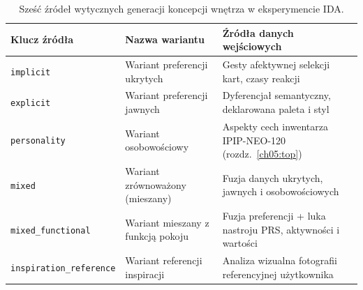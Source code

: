 \begin{table}[htbp]
  \centering
  \caption{Sześć źródeł wytycznych generacji koncepcji wnętrza w eksperymencie IDA.}
  \label{tab:ch03:sources}
  \begin{tabular}{@{}p{}>{\raggedright\arraybackslash}p{}>{\raggedright\arraybackslash}p{}@{}}
    \toprule
    Klucz źródła & Nazwa wariantu & Źródła danych wejściowych \\
    \midrule
    \texttt{implicit}
      & Wariant preferencji ukrytych
      & Gesty afektywnej selekcji kart, czasy reakcji \\
    \texttt{explicit}
      & Wariant preferencji jawnych
      & Dyferencjał semantyczny, deklarowana paleta i styl \\
    \texttt{personality}
      & Wariant osobowościowy
      & Aspekty cech inwentarza IPIP-NEO-120 (rozdz.~\ref{ch05:top}) \\
    \texttt{mixed}
      & Wariant zrównoważony (mieszany)
      & Fuzja danych ukrytych, jawnych i osobowościowych \\
    \texttt{mixed\_functional}
      & Wariant mieszany z funkcją pokoju
      & Fuzja preferencji + luka nastroju PRS, aktywności i wartości \\
    \texttt{inspiration\_reference}
      & Wariant referencji inspiracji
      & Analiza wizualna fotografii referencyjnej użytkownika \\
    \bottomrule
  \end{tabular}
\end{table}

